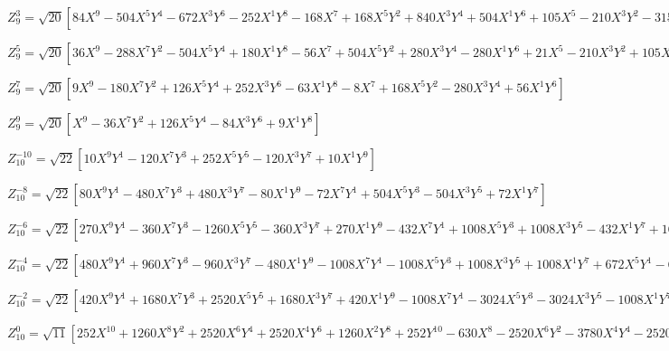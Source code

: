 \documentclass[10pt,landscape]{article}
\begin{document}
\vspace{1.2 mm}
\noindent $ Z^{3}_{9} = \sqrt{20} [84X^{9} -504X^{5}Y^{4} -672X^{3}Y^{6} -252X^{1}Y^{8} -168X^{7} +168X^{5}Y^{2} +840X^{3}Y^{4} +504X^{1}Y^{6} +105X^{5} -210X^{3}Y^{2} -315X^{1}Y^{4} -20X^{3} +60X^{1}Y^{2}] $

\vspace{1.2 mm}
\noindent $ Z^{5}_{9} = \sqrt{20} [36X^{9} -288X^{7}Y^{2} -504X^{5}Y^{4} +180X^{1}Y^{8} -56X^{7} +504X^{5}Y^{2} +280X^{3}Y^{4} -280X^{1}Y^{6} +21X^{5} -210X^{3}Y^{2} +105X^{1}Y^{4}] $

\vspace{1.2 mm}
\noindent $ Z^{7}_{9} = \sqrt{20} [9X^{9} -180X^{7}Y^{2} +126X^{5}Y^{4} +252X^{3}Y^{6} -63X^{1}Y^{8} -8X^{7} +168X^{5}Y^{2} -280X^{3}Y^{4} +56X^{1}Y^{6}] $

\vspace{1.2 mm}
\noindent $ Z^{9}_{9} = \sqrt{20} [X^{9} -36X^{7}Y^{2} +126X^{5}Y^{4} -84X^{3}Y^{6} +9X^{1}Y^{8}] $

\vspace{1.2 mm}
\noindent $ Z^{-10}_{10} = \sqrt{22} [10X^{9}Y^{1} -120X^{7}Y^{3} +252X^{5}Y^{5} -120X^{3}Y^{7} +10X^{1}Y^{9}] $

\vspace{1.2 mm}
\noindent $ Z^{-8}_{10} = \sqrt{22} [80X^{9}Y^{1} -480X^{7}Y^{3} +480X^{3}Y^{7} -80X^{1}Y^{9} -72X^{7}Y^{1} +504X^{5}Y^{3} -504X^{3}Y^{5} +72X^{1}Y^{7}] $

\vspace{1.2 mm}
\noindent $ Z^{-6}_{10} = \sqrt{22} [270X^{9}Y^{1} -360X^{7}Y^{3} -1260X^{5}Y^{5} -360X^{3}Y^{7} +270X^{1}Y^{9} -432X^{7}Y^{1} +1008X^{5}Y^{3} +1008X^{3}Y^{5} -432X^{1}Y^{7} +168X^{5}Y^{1} -560X^{3}Y^{3} +168X^{1}Y^{5}] $

\vspace{1.2 mm}
\noindent $ Z^{-4}_{10} = \sqrt{22} [480X^{9}Y^{1} +960X^{7}Y^{3} -960X^{3}Y^{7} -480X^{1}Y^{9} -1008X^{7}Y^{1} -1008X^{5}Y^{3} +1008X^{3}Y^{5} +1008X^{1}Y^{7} +672X^{5}Y^{1} -672X^{1}Y^{5} -140X^{3}Y^{1} +140X^{1}Y^{3}] $

\vspace{1.2 mm}
\noindent $ Z^{-2}_{10} = \sqrt{22} [420X^{9}Y^{1} +1680X^{7}Y^{3} +2520X^{5}Y^{5} +1680X^{3}Y^{7} +420X^{1}Y^{9} -1008X^{7}Y^{1} -3024X^{5}Y^{3} -3024X^{3}Y^{5} -1008X^{1}Y^{7} +840X^{5}Y^{1} +1680X^{3}Y^{3} +840X^{1}Y^{5} -280X^{3}Y^{1} -280X^{1}Y^{3} +30X^{1}Y^{1}] $

\vspace{1.2 mm}
\noindent $ Z^{0}_{10} = \sqrt{11} [252X^{10} +1260X^{8}Y^{2} +2520X^{6}Y^{4} +2520X^{4}Y^{6} +1260X^{2}Y^{8} +252Y^{10} -630X^{8} -2520X^{6}Y^{2} -3780X^{4}Y^{4} -2520X^{2}Y^{6} -630Y^{8} +560X^{6} +1680X^{4}Y^{2} +1680X^{2}Y^{4} +560Y^{6} -210X^{4} -420X^{2}Y^{2} -210Y^{4} +30X^{2} +30Y^{2} -1] $
\end{document}
